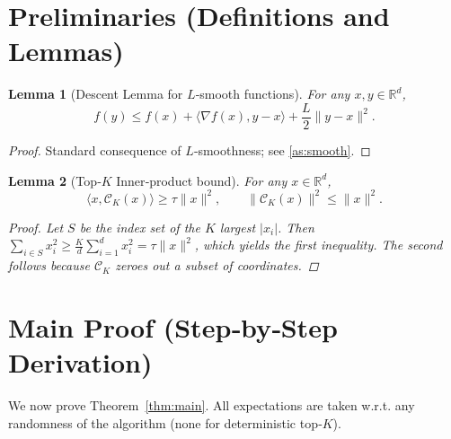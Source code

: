 \documentclass{article}
\newtheorem{lemma}{Lemma}
\newcommand{\R}{\mathbb{R}}
\begin{document}
\newpage
\section*{Preliminaries (Definitions and Lemmas)}
\begin{lemma}[Descent Lemma for $L$‑smooth functions]\label{lem:descent}
For any $x,y\in\R^{d}$,
\[
f(y)\le f(x)+\langle\nabla f(x),y-x\rangle+\frac{L}{2}\|y-x\|^{2}.
\]
\end{lemma}
\begin{proof}
Standard consequence of $L$‑smoothness; see \ref{as:smooth}.
\end{proof}

\begin{lemma}[Top‑$K$ Inner‑product bound]\label{lem:inner}
For any $x\in\R^{d}$,
\[
\langle x,\mathcal{C}_{K}(x)\rangle\ge\tau\|x\|^{2},
\qquad
\|\mathcal{C}_{K}(x)\|^{2}\le\|x\|^{2}.
\]
\begin{proof}
Let $S$ be the index set of the $K$ largest $|x_{i}|$.
Then $\sum_{i\in S}x_{i}^{2}\ge\frac{K}{d}\sum_{i=1}^{d}x_{i}^{2}= \tau\|x\|^{2}$,
which yields the first inequality. The second follows because $\mathcal{C}_{K}$
zeroes out a subset of coordinates.
\end{proof}
\end{lemma}

\section*{Main Proof (Step‑by‑Step Derivation)}
We now prove Theorem~\ref{thm:main}. All expectations are taken w.r.t. any
randomness of the algorithm (none for deterministic top‑$K$).
\end{document}

